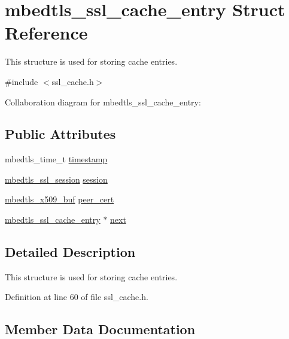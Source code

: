 \hypertarget{structmbedtls__ssl__cache__entry}{}\section{mbedtls\+\_\+ssl\+\_\+cache\+\_\+entry Struct Reference}
\label{structmbedtls__ssl__cache__entry}


This structure is used for storing cache entries.  




{\ttfamily \#include $<$ssl\+\_\+cache.\+h$>$}



Collaboration diagram for mbedtls\+\_\+ssl\+\_\+cache\+\_\+entry\+:
\subsection*{Public Attributes}
\begin{DoxyCompactItemize}
\item 
mbedtls\+\_\+time\+\_\+t \mbox{\hyperlink{structmbedtls__ssl__cache__entry_a19cb2ae2020c7bf77ad5cc949d0c8967}{timestamp}}
\item 
\mbox{\hyperlink{structmbedtls__ssl__session}{mbedtls\+\_\+ssl\+\_\+session}} \mbox{\hyperlink{structmbedtls__ssl__cache__entry_ade27f016c0924422c5ba5e68650744bc}{session}}
\item 
\mbox{\hyperlink{group__x509__module_ga4d02c9e8e4e2934555e0d132cd2976dc}{mbedtls\+\_\+x509\+\_\+buf}} \mbox{\hyperlink{structmbedtls__ssl__cache__entry_aaa3550f088fef5e3e2ea793076d77a86}{peer\+\_\+cert}}
\item 
\mbox{\hyperlink{structmbedtls__ssl__cache__entry}{mbedtls\+\_\+ssl\+\_\+cache\+\_\+entry}} $\ast$ \mbox{\hyperlink{structmbedtls__ssl__cache__entry_a83fee0c73af53bc816d6a5f2ac795481}{next}}
\end{DoxyCompactItemize}


\subsection{Detailed Description}
This structure is used for storing cache entries. 

Definition at line 60 of file ssl\+\_\+cache.\+h.



\subsection{Member Data Documentation}
\mbox{\label{structmbedtls__ssl__cache__entry_a83fee0c73af53bc816d6a5f2ac795481}} 
